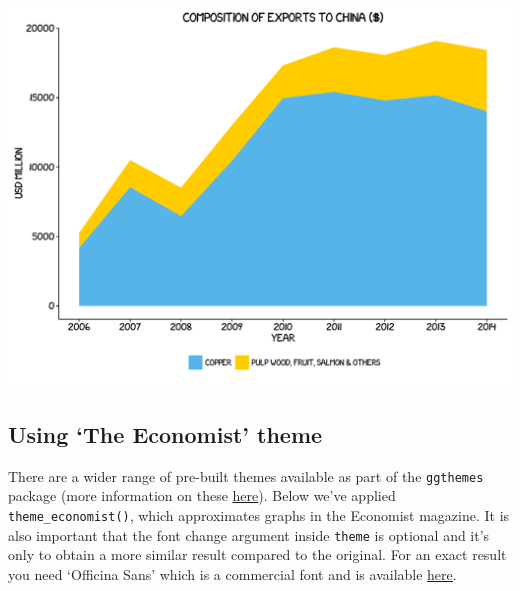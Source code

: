 \documentclass[]{article}
\begin{document}
\begin{center}\includegraphics{0_all_posts_pdf/area_8-1} \end{center}

\subsection{\texorpdfstring{Using `The Economist'
theme}{Using The Economist theme}}\label{using-the-economist-theme-1}

There are a wider range of pre-built themes available as part of the
\texttt{ggthemes} package (more information on these
\href{https://cran.r-project.org/web/packages/ggthemes/vignettes/ggthemes.html}{here}).
Below we've applied \texttt{theme\_economist()}, which approximates
graphs in the Economist magazine. It is also important that the font
change argument inside \texttt{theme} is optional and it's only to
obtain a more similar result compared to the original. For an exact
result you need `Officina Sans' which is a commercial font and is
available \href{http://www.myfonts.com/fonts/itc/officina-sans/}{here}.
\end{document}
